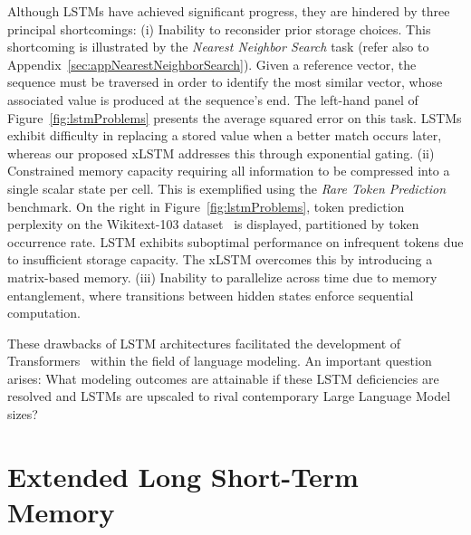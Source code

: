 Although LSTMs have achieved significant progress, they are hindered by three principal shortcomings: (i) Inability to reconsider prior storage choices. This shortcoming is illustrated by the 
{\it Nearest Neighbor Search} task (refer also to Appendix~\ref{sec:appNearestNeighborSearch}). Given a reference vector, the sequence must be traversed in order to identify the most similar vector, whose associated value is produced at the sequence’s end. The left-hand panel of Figure~\ref{fig:lstmProblems} presents the average squared error on this task. LSTMs exhibit difficulty in replacing a stored value when a better match occurs later, whereas our proposed xLSTM addresses this through exponential gating. (ii) Constrained memory capacity requiring all information to be compressed into a single scalar state per cell. This is exemplified using the {\it Rare Token Prediction} benchmark. On the right in Figure~\ref{fig:lstmProblems}, token prediction perplexity on the Wikitext-103 dataset~\citep{Merity:17} is displayed, partitioned by token occurrence rate. LSTM exhibits suboptimal performance on infrequent tokens due to insufficient storage capacity. The xLSTM overcomes this by introducing a matrix-based memory. (iii) Inability to parallelize across time due to memory entanglement, where transitions between hidden states enforce sequential computation.

These drawbacks of LSTM architectures facilitated the development of Transformers~\citep{Vaswani:17} within the field of language modeling. An important question arises: What modeling outcomes are attainable if these LSTM deficiencies are resolved and LSTMs are upscaled to rival contemporary Large Language Model sizes?

\section{Extended Long Short-Term Memory}
\label{sec:xLSTM}

